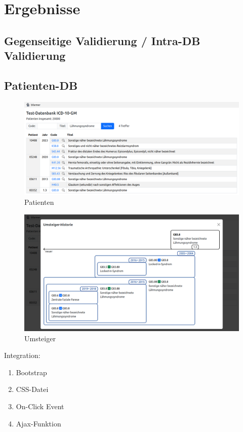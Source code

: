 \section{Ergebnisse}

\subsection{Gegenseitige Validierung / Intra-DB Validierung}

\cite{intradbvalid}

\subsection{Patienten-DB}

\begin{figure}[H]
    \centering
    \includegraphics[width=.8\linewidth]{../img/patients_screenshot.png}
    \caption{Patienten}
\end{figure}

\begin{figure}[H]
    \centering
    \includegraphics[width=.8\linewidth]{../img/umsteiger_screenshot.png}
    \caption{Umsteiger}
\end{figure}

Integration:

\begin{enumerate}
\item Bootstrap
\item CSS-Datei
\item On-Click Event
\item Ajax-Funktion
\end{enumerate}

